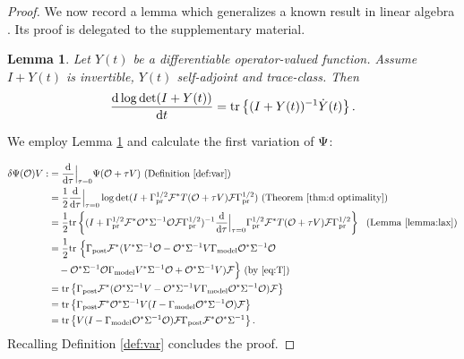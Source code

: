 \documentclass{article}
\newtheorem{lemma}{Lemma}
\begin{document}
\begin{proof}
  We now record a lemma which generalizes a known result in linear
  algebra \cite[Chapter 9, Theorem 4]{Lax07}. Its proof is delegated
  to the supplementary material.
  \begin{lemma}\label{lemma:lax}
    Let $Y(t)$ be a differentiable operator-valued function. Assume 
    $I+Y(t)$ is invertible, $Y(t)$ self-adjoint and trace-class. Then
    \begin{equation*}
      \frac{\text{\textup{d}} \log \det (I+Y(t))}{\text{\textup{d}} t} = \textup{tr}\left \{(I+Y(t))^{-1} \dot{Y}(t) \right \}.
    \end{equation*}
  \end{lemma}
  
  We employ Lemma \ref{lemma:lax} and calculate the first variation of
  $\Psi$:

  \begin{align*}
      \delta \Psi(\mathcal{O}) V 
      :&= \frac{\text{\textup{d}}}{\text{\textup{d}}\tau} \Big |_{\tau=0} \Psi(\mathcal{O} + \tau V) \text{ (Definition \ref{def:var})}\\
      &= \frac12 \frac{\text{\textup{d}}}{\text{\textup{d}} \tau} \Big |_{\tau=0} \log \det 
      (I + \Gamma_{\textup{pr}}^{1/2} \mathcal{F}^* T(\mathcal{O}+\tau V)\mathcal{F} \Gamma_{\textup{pr}}^{1/2} ) \text{ (Theorem \ref{thm:d optimality})} \\
      &= \frac12 \textup{tr}\left \{( I + \Gamma_{\textup{pr}}^{1/2} \mathcal{F}^* \mathcal{O}^* \Sigma^{-1}
        \mathcal{O}\mathcal{F} \Gamma_{\textup{pr}}^{1/2} )^{-1}
        \frac{\text{\textup{d}}}{\text{\textup{d}} \tau} \Big |_{\tau=0}
        \Gamma_{\textup{pr}}^{1/2} \mathcal{F}^* T(\mathcal{O}+\tau V) \mathcal{F} \Gamma_{\textup{pr}}^{1/2} \right \}\ \text{ (Lemma \ref{lemma:lax})} \\
      &= \frac12 \textup{tr}\ \Big \{ \Gamma_{\textup{post}} \mathcal{F}^* (V^* \Sigma^{-1} \mathcal{O} 
      - \mathcal{O}^*\Sigma^{-1} V\Gamma_{\textup{model}} \mathcal{O}^* \Sigma^{-1}\mathcal{O} \\
      &\ \ \ - \mathcal{O}^* \Sigma^{-1} \mathcal{O} \Gamma_{\textup{model}} V^* \Sigma^{-1}\mathcal{O} 
      + \mathcal{O}^* \Sigma^{-1} V ) \mathcal{F} \Big \}  \text{ (by \eqref{eq:T})} \\
      &= \textup{tr}\left \{\Gamma_{\textup{post}} \mathcal{F}^* ( \mathcal{O}^* \Sigma^{-1} V -
      \mathcal{O}^*\Sigma^{-1} V\Gamma_{\textup{model}} \mathcal{O}^* \Sigma^{-1}\mathcal{O} ) \mathcal{F} \right \} \\
      &= \textup{tr}\left \{\Gamma_{\textup{post}} \mathcal{F}^* \mathcal{O}^* \Sigma^{-1} V 
      ( I - \Gamma_{\textup{model}} \mathcal{O}^* \Sigma^{-1}\mathcal{O} ) \mathcal{F} \right \} \\
      &= \textup{tr}\left \{V ( I - \Gamma_{\textup{model}} \mathcal{O}^* \Sigma^{-1}\mathcal{O} )
      \mathcal{F} \Gamma_{\textup{post}} \mathcal{F}^* \mathcal{O}^* \Sigma^{-1} \right \}.
  \end{align*} 
  Recalling Definition \ref{def:var} concludes the proof.
\end{proof}
\end{document}
